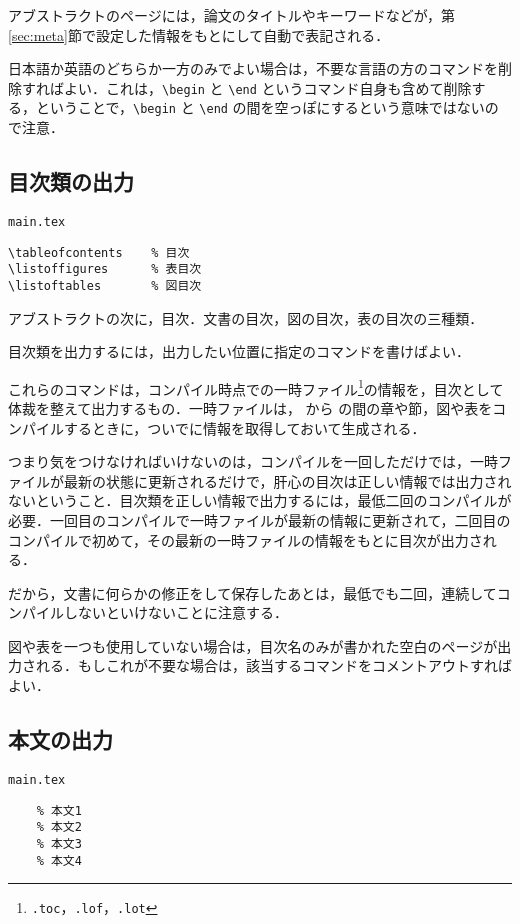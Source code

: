 アブストラクトのページには，論文のタイトルやキーワードなどが，第\ref{sec:meta}節で設定した情報をもとにして自動で表記される．

日本語か英語のどちらか一方のみでよい場合は，不要な言語の方のコマンドを削除すればよい．これは，\verb|\begin| と \verb|\end| というコマンド自身も含めて削除する，ということで，\verb|\begin| と \verb|\end| の間を空っぽにするという意味ではないので注意．



\subsection{目次類の出力}
\label{sec:toc}

\begin{itembox}[l]{{\tt main.tex}}
\begin{verbatim}
\tableofcontents	% 目次
\listoffigures		% 表目次
\listoftables		% 図目次
\end{verbatim}
\end{itembox}

アブストラクトの次に，目次．文書の目次，図の目次，表の目次の三種類．

目次類を出力するには，出力したい位置に指定のコマンドを書けばよい．

これらのコマンドは，コンパイル時点での一時ファイル\footnote{{\tt *.toc}，{\tt *.lof}，{\tt *.lot}}の情報を，目次として体裁を整えて出力するもの．一時ファイルは，\verb|| から \verb|| の間の章や節，図や表をコンパイルするときに，ついでに情報を取得しておいて生成される．

つまり気をつけなければいけないのは，コンパイルを一回しただけでは，一時ファイルが最新の状態に更新されるだけで，肝心の目次は正しい情報では出力されないということ．目次類を正しい情報で出力するには，最低二回のコンパイルが必要．一回目のコンパイルで一時ファイルが最新の情報に更新されて，二回目のコンパイルで初めて，その最新の一時ファイルの情報をもとに目次が出力される．

だから，文書に何らかの修正をして保存したあとは，最低でも二回，連続してコンパイルしないといけないことに注意する．

図や表を一つも使用していない場合は，目次名のみが書かれた空白のページが出力される．もしこれが不要な場合は，該当するコマンドをコメントアウトすればよい．


\subsection{本文の出力}

\begin{itembox}[l]{{\tt main.tex}}
\begin{verbatim}
	% 本文1
	% 本文2
	% 本文3
	% 本文4
\end{verbatim}
\end{itembox}

